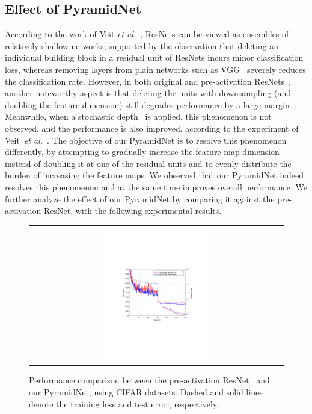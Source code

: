 \documentclass[10pt,twocolumn,letterpaper]{article}
\begin{document}
\subsection{Effect of PyramidNet}
According to the work of Veit {\it et al.}~\cite{ensemble}, ResNets can be viewed as ensembles of relatively shallow networks, supported by the observation that deleting an individual building block in a residual unit of ResNets incurs minor classification loss, whereas removing layers from plain networks such as VGG~\cite{VGG} severely reduces the classification rate. However, in both original and pre-activation ResNets~\cite{resnet,preresnet}, another noteworthy aspect is that deleting the units with downsampling (and doubling the feature dimension) still degrades performance by a large margin~\cite{ensemble}. Meanwhile, when a stochastic depth~\cite{stochasticdepth} is applied, this phenomenon is not observed, and the performance is also improved, according to the experiment of Veit~{\it et al.}~\cite{ensemble}. The objective of our PyramidNet is to resolve this phenomenon differently, by attempting to gradually increase the feature map dimension instead of doubling it at one of the residual units and to evenly distribute the burden of increasing the feature maps. We observed that our PyramidNet indeed resolves this phenomenon and at the same time improves overall performance. We further analyze the effect of our PyramidNet by comparing it against the pre-activation ResNet, with the following experimental results.
\begin{figure}[t]
\begin{center}
\begin{tabular}{c}
\includegraphics[trim = 37mm 83mm 31mm 87mm, clip, width=0.42\textwidth, height=0.3\textwidth]{Images2/cifar10_base_addpyr2.pdf}
\end{tabular}
\end{center}
\caption{Performance comparison between the pre-activation ResNet~\cite{preresnet} and our PyramidNet, using CIFAR datasets. Dashed and solid lines denote the training loss and test error, respectively.}
\label{fig:curves}
\end{figure}
\end{document}
